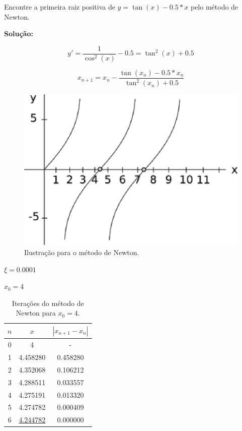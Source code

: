 \begin{example}
\label{ex:newton1}

Encontre a primeira raiz positiva de $y = \tan(x) - 0.5 \ast x$ pelo método de Newton.

\textbf{Solução:}

\[
 y' = \frac{1}{\cos^{2}(x)} - 0.5 = \tan^{2}(x) + 0.5
\]

\[
 x_{n+1} = x_{n} - \frac{\tan(x_{n}) - 0.5 \ast x_{n}}{\tan^{2}(x_{n}) + 0.5}
\]

\begin{figure}[htb]
  \setlength{\abovecaptionskip}{20pt}
  \centering
  \includegraphics[scale=0.8]{capitulos/capitulo1/figuras/newton2.eps}
  \caption{Ilustração para o método de Newton.}
  \label{fig:newton2}
\end{figure}

\begin{enumerar}
\item $\xi = 0.0001$

\item $x_{0} = 4$

\begin{table}[htp]
\footnotesize
	\centering		
		\begin{tabular}{|c|c|c|}
		\hline		
		\textbf{$n$} & \textbf{$x$} & \textbf{$\displaystyle | x_{n+1} - x_{n} |$}\\
		\hline \hline 
		0 & 4 & -\\
		\hline 
		1 & 4.458280 & 0.458280\\
		\hline 
		2 & 4.352068 & 0.106212\\
		\hline
		3 & 4.288511 & 0.033557\\
		\hline
		4 & 4.275191 & 0.013320\\
		\hline
		5 & 4.274782 & 0.000409\\
		\hline
		6 & \underline{4.244782} & 0.000000\\
		\hline
		\end{tabular}
	\caption{Iterações do método de Newton para $x_{0} = 4$.}
	\label{tab:newton3}
\end{table}


\end{enumerar}
\end{example}
